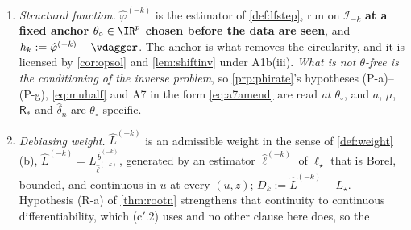\begin{definition}
\begin{enumerate}
At $\mathsf L=2$ both bounds are the ones earlier rounds printed.
\item[(b)] \emph{Structural function.} $\hat\varphi^{(-k)}$ is the estimator of \cref{def:lfstep}, run on
$\mathcal I_{-k}$ \textbf{at a fixed anchor $\theta_\circ\in\IR^{p}$ chosen before the data are seen}, and
$h_k:=\hat\varphi^{(-k)}-\vdagger$. The anchor is what removes the circularity, and it is licensed by
\cref{cor:opsol} and \cref{lem:shiftinv} under A1b(iii). \emph{What is not $\theta$-free is the
conditioning of the inverse problem}, so \cref{prp:phirate}'s hypotheses (P-a)--(P-g), \eqref{eq:muhalf} and
A7 in the form \eqref{eq:a7amend} are read \emph{at $\theta_\circ$}, and $a$, $\mu$, $\mathsf R_\ast$ and
$\hat\delta_n$ are $\theta_\circ$-specific.
\item[(c)] \emph{Debiasing weight.} $\hat L^{(-k)}$ is an admissible weight in the sense of
\cref{def:weight}(b), $\hat L^{(-k)}=L^{\,\hat b^{(-k)}}_{\hat\ell^{(-k)}}$, generated by an estimator
$\hat\ell^{(-k)}$ of $\ell_\star$ that is Borel, bounded, and continuous in $u$ at every $(u,z)$;
$D_k:=\hat L^{(-k)}-L_\star$. Hypothesis (R-a) of \cref{thm:rootn} strengthens that continuity to
continuous differentiability, which \textup{(c$'$.2)} uses and no other clause here does, so the

\end{enumerate}
\end{definition}
